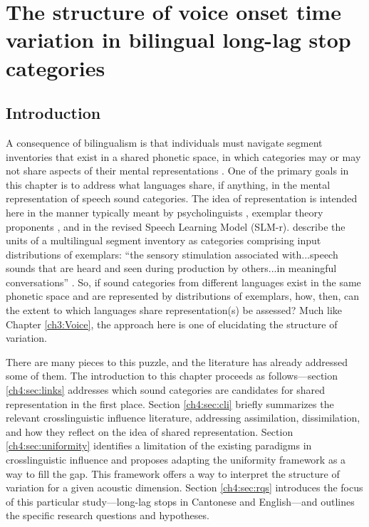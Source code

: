 \setcounter{chapter}{3}

\chapter{The structure of voice onset time variation in bilingual long-lag stop categories}\label{Uniformity}

\section{Introduction}\label{ch4:sec:intro}

A consequence of bilingualism is that individuals must navigate segment inventories that exist in a shared phonetic space, in which categories may or may not share aspects of their mental representations \citep{flege_2021_slmr}. One of the primary goals in this chapter is to address what languages share, if anything, in the mental representation of speech sound categories. The idea of representation is intended here in the manner typically meant by psycholinguists \citep[e.g.,][]{llompart_2018_acoustic}, exemplar theory proponents \citep[e.g.,][]{amengual_2018_laterals}, and \citet{flege_2021_slmr} in the revised Speech Learning Model (SLM-r). \citeauthor{flege_2021_slmr} describe the units of a multilingual segment inventory as categories comprising input distributions of exemplars: ``the sensory stimulation associated with...speech sounds that are heard and seen during production by others...in meaningful conversations'' \citep[][p. 32]{flege_2021_slmr}. So, if sound categories from different languages exist in the same phonetic space and are represented by distributions of exemplars, how, then, can the extent to which languages share representation(s) be assessed? Much like Chapter \ref{ch3:Voice}, the approach here is one of elucidating the structure of variation. 

There are many pieces to this puzzle, and the literature has already addressed some of them. The introduction to this chapter proceeds as follows---section \ref{ch4:sec:links} addresses which sound categories are candidates for shared representation in the first place. Section \ref{ch4:sec:cli} briefly summarizes the relevant crosslinguistic influence literature, addressing assimilation, dissimilation, and how they reflect on the idea of shared representation. Section \ref{ch4:sec:uniformity} identifies a limitation of the existing paradigms in crosslinguistic influence and proposes adapting the uniformity framework as a way to fill the gap. This framework offers a way to interpret the structure of variation for a given acoustic dimension. Section \ref{ch4:sec:rqs} introduces the focus of this particular study---long-lag stops in Cantonese and English---and outlines the specific research questions and hypotheses.

